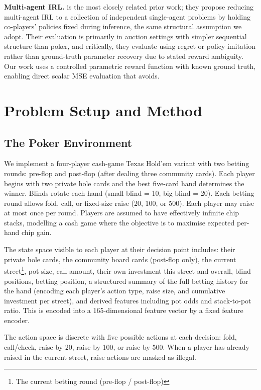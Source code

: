 \documentclass{article}
\begin{document}
\textbf{Multi-agent IRL.} \citet{fu2021evaluating} is the most closely related prior work; they propose reducing multi-agent IRL to a collection of independent single-agent problems by holding co-players' policies fixed during inference, the same structural assumption we adopt. Their evaluation is primarily in auction settings with simpler sequential structure than poker, and critically, they evaluate using regret or policy imitation rather than ground-truth parameter recovery due to stated reward ambiguity. Our work uses a controlled parametric reward function with known ground truth, enabling direct scalar MSE evaluation that \citet{fu2021evaluating} avoids.


\section{Problem Setup and Method}

\subsection{The Poker Environment}

We implement a four-player cash-game Texas Hold'em variant with two betting rounds: pre-flop and post-flop (after dealing three community cards). Each player begins with two private hole cards and the best five-card hand determines the winner. Blinds rotate each hand (small blind = 10, big blind = 20). Each betting round allows fold, call, or fixed-size raise (20, 100, or 500). Each player may raise at most once per round. Players are assumed to have effectively infinite chip stacks, modelling a cash game where the objective is to maximise expected per-hand chip gain.

The state space visible to each player at their decision point includes: their private hole cards, the community board cards (post-flop only), the current street\footnote{The current betting round (pre-flop / post-flop)}, pot size, call amount, their own investment this street and overall, blind positions, betting position, a structured summary of the full betting history for the hand (encoding each player's action type, raise size, and cumulative investment per street), and derived features including pot odds and stack-to-pot ratio. This is encoded into a 165-dimensional feature vector by a fixed feature encoder.

The action space is discrete with five possible actions at each decision: fold, call/check, raise by 20, raise by 100, or raise by 500. When a player has already raised in the current street, raise actions are masked as illegal.
\end{document}
